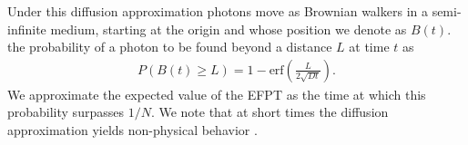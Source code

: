 Under this diffusion approximation photons move as Brownian walkers in a semi-infinite medium, starting at the origin and whose position we denote as $B(t)$.  the probability of a photon to be found beyond a distance $L$ at time $t$  as~\cite{redner_8_2001,lawley_distribution_2020}
\begin{align}\label{eq:diffProb}
     P\left(B\left(t\right) \geq L\right) = 1-\textrm{erf}\left(\frac{L}{2 \sqrt{D t}}\right).
\end{align}
We approximate the expected value of the EFPT as the time at which this probability surpasses $1/N$. We note that at short times the diffusion approximation yields non-physical behavior .



